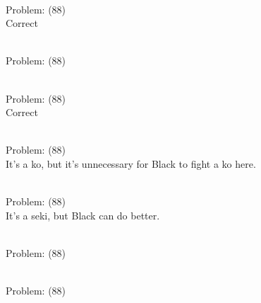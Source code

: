 \documentclass[11pt]{article}
\begin{document}
\begin{minipage}[t]{0.5\textwidth}
  {\centering
  
\\
Problem: (88)\\
Correct\\
  }
\end{minipage}
\begin{minipage}[t]{0.5\textwidth}
  {\centering
  
\\
Problem: (88)\\
  }
\end{minipage}
\begin{minipage}[t]{0.5\textwidth}
  {\centering
  
\\
Problem: (88)\\
Correct\\
  }
\end{minipage}
\begin{minipage}[t]{0.5\textwidth}
  {\centering
  
\\
Problem: (88)\\
It's a ko, but it's unnecessary for Black to fight a ko here.\\
  }
\end{minipage}
\begin{minipage}[t]{0.5\textwidth}
  {\centering
  
\\
Problem: (88)\\
It's a seki, but Black can do better.\\
  }
\end{minipage}
\begin{minipage}[t]{0.5\textwidth}
  {\centering
  
\\
Problem: (88)\\
  }
\end{minipage}
\begin{minipage}[t]{0.5\textwidth}
  {\centering
  
\\
Problem: (88)\\
  }
\end{minipage}
\end{document}
